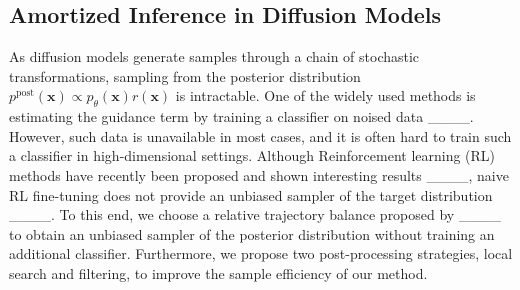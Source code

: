 \subsection{Amortized Inference in Diffusion Models}
As diffusion models generate samples through a chain of stochastic transformations, sampling from the posterior distribution $p^{\text{post}}(\mathbf{x}) \propto p_\theta(\mathbf{x})r(\mathbf{x})$ is intractable. One of the widely used methods is estimating the guidance term by training a classifier on noised data ____. However, such data is unavailable in most cases, and it is often hard to train such a classifier in high-dimensional settings. Although Reinforcement learning (RL) methods have recently been proposed and shown interesting results ____, naive RL fine-tuning does not provide an unbiased sampler of the target distribution ____. To this end, we choose a relative trajectory balance proposed by ____ to obtain an unbiased sampler of the posterior distribution without training an additional classifier. Furthermore, we propose two post-processing strategies, local search and filtering, to improve the sample efficiency of our method.